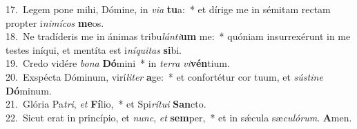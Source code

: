 {17.~}Legem pone mihi, Dómine, in \textit{vi}\textit{a} \textbf{tu}a:~* et dírige me in sémitam rectam propter i\textit{ni}\textit{mí}\textit{cos} \textbf{me}os.\\
{18.~}Ne tradíderis me in ánimas tribu\textit{lán}\textit{ti}\textbf{um} me:~* quóniam insurrexérunt in me testes iníqui, et mentíta est i\textit{ní}\textit{qui}\textit{tas} \textbf{si}bi.\\
{19.~}Credo vidére \textit{bo}\textit{na} \textbf{Dó}mini~* in \textit{ter}\textit{ra} \textit{vi}\textbf{vén}tium.\\
{20.~}Exspécta Dóminum, virí\textit{li}\textit{ter} \textbf{a}ge:~* et confortétur cor tuum, et \textit{sú}\textit{sti}\textit{ne} \textbf{Dó}minum.\\
{21.~}Glória Pa\textit{tri}, \textit{et} \textbf{Fí}lio,~* et Spi\textit{rí}\textit{tu}\textit{i} \textbf{San}cto.\\
{22.~}Sicut erat in princípio, et \textit{nunc}, \textit{et} \textbf{sem}per,~* et in sǽcula sæ\textit{cu}\textit{ló}\textit{rum}. \textbf{A}men.\\
